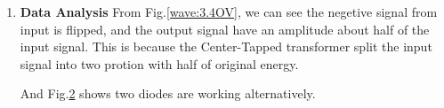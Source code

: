 \begin{enumerate}[I]
\begin{figure}[H]
\begin{subfigure}[H]{0.4\textwidth}
                    \caption{Diode Voltage}
                    \label{wave:3.4DV}
                \end{subfigure}
            \end{figure}
        \item \textbf{Data Analysis}\newline
            From Fig.\ref{wave:3.4OV}, we can see the negetive signal from input is flipped, and the output signal have an amplitude about half of the input signal. This is because the Center-Tapped transformer split the input signal into two protion with half of original energy.\par
            
            And Fig.\ref{wave:3.4DV} shows two diodes are working alternatively.
    \end{enumerate}

